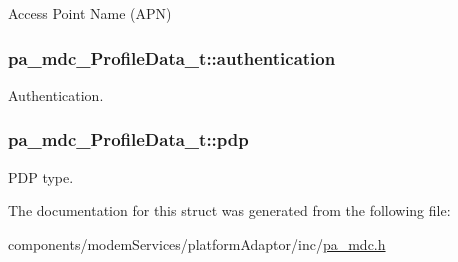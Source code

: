 Access Point Name (A\+PN) 

\subsubsection[{\texorpdfstring{authentication}{authentication}}]{ pa\+\_\+mdc\+\_\+\+Profile\+Data\+\_\+t\+::authentication}\hypertarget{structpa__mdc___profile_data__t_adc69a3abd177f26adf45468d401c6787}{}\label{structpa__mdc___profile_data__t_adc69a3abd177f26adf45468d401c6787}


Authentication. 

\subsubsection[{\texorpdfstring{pdp}{pdp}}]{ pa\+\_\+mdc\+\_\+\+Profile\+Data\+\_\+t\+::pdp}\hypertarget{structpa__mdc___profile_data__t_aba91d2e7bfc41d085211924e249564c3}{}\label{structpa__mdc___profile_data__t_aba91d2e7bfc41d085211924e249564c3}


P\+DP type. 



The documentation for this struct was generated from the following file\+:\begin{DoxyCompactItemize}
\item 
components/modem\+Services/platform\+Adaptor/inc/\hyperlink{pa__mdc_8h}{pa\+\_\+mdc.\+h}\end{DoxyCompactItemize}
